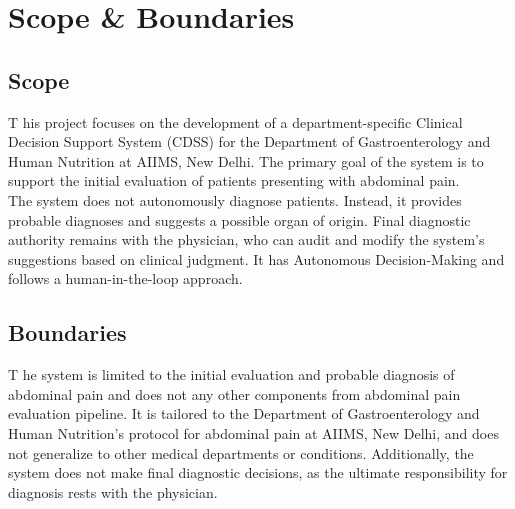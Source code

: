 \section{Scope \& Boundaries}
\subsection{Scope}
\lettrine{T}{ }his project focuses on the development of a department-specific Clinical Decision Support System (CDSS) for the Department of Gastroenterology and Human Nutrition at AIIMS, New Delhi. The primary goal of the system is to support the initial evaluation of patients presenting with abdominal pain.\\[\baselineskip]

\noindent The system does not autonomously diagnose patients. Instead, it provides probable diagnoses and suggests a possible organ of origin. Final diagnostic authority remains with the physician, who can audit and modify the system's suggestions based on clinical judgment. It has Autonomous Decision-Making and follows a human-in-the-loop approach.

\subsection{Boundaries}
\lettrine{T}{ }he system is limited to the initial evaluation and probable diagnosis of abdominal pain and does not any other components from abdominal pain evaluation pipeline. It is tailored to the Department of Gastroenterology and Human Nutrition's protocol for abdominal pain at AIIMS, New Delhi, and does not generalize to other medical departments or conditions. Additionally, the system does not make final diagnostic decisions, as the ultimate responsibility for diagnosis rests with the physician.